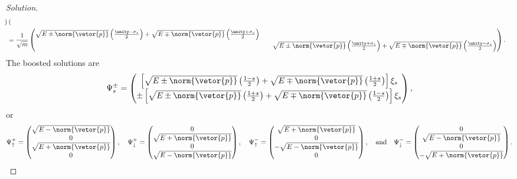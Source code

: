 \begin{proof}[Solution]
\begin{align*}
\begin{pmatrix}
      \end{pmatrix}\\
      &= \frac{1}{\sqrt{m}}\begin{pmatrix}
         \sqrt{E \pm \norm{\vetor{p}}} \left(\frac{\unity - \sigma_z}{2}\right) + \sqrt{E \mp \norm{\vetor{p}}} \left(\frac{\unity + \sigma_z}2\right)&&\\
         &&\sqrt{E \pm \norm{\vetor{p}}} \left(\frac{\unity + \sigma_z}{2}\right) + \sqrt{E \mp \norm{\vetor{p}}} \left(\frac{\unity - \sigma_z}2\right)
      \end{pmatrix}.
   \end{align*}
   The boosted solutions are
   \begin{equation*}
      \Psi_s^{\pm} = \begin{pmatrix}
         \left[\sqrt{E \pm \norm{\vetor{p}}} \left(\frac{1 - s}{2}\right) + 
         \sqrt{E \mp \norm{\vetor{p}}} \left(\frac{1 + s}{2}\right)\right] \xi_s\\
         \pm\left[\sqrt{E \pm \norm{\vetor{p}}} \left(\frac{1 + s}{2}\right) + 
         \sqrt{E \mp \norm{\vetor{p}}} \left(\frac{1 - s}{2}\right)\right]\xi_s
      \end{pmatrix},
   \end{equation*}
   or
   \begin{equation*}
       \Psi^+_\uparrow = \begin{pmatrix}
          \sqrt{E - \norm{\vetor{p}}}\\
          0\\
          \sqrt{E + \norm{\vetor{p}}}\\
          0
       \end{pmatrix},\quad
       \Psi^+_\downarrow = \begin{pmatrix}
          0\\
          \sqrt{E + \norm{\vetor{p}}}\\
          0\\
          \sqrt{E - \norm{\vetor{p}}}
       \end{pmatrix},\quad
       \Psi^-_\uparrow = \begin{pmatrix}
          \sqrt{E + \norm{\vetor{p}}}\\
          0\\
          -\sqrt{E - \norm{\vetor{p}}}\\
          0
       \end{pmatrix},\quad\text{and}\quad
       \Psi^-_\downarrow = \begin{pmatrix}
          0\\
          \sqrt{E - \norm{\vetor{p}}}\\
          0\\
          -\sqrt{E + \norm{\vetor{p}}}
       \end{pmatrix}.
   \end{equation*}


\end{proof}
